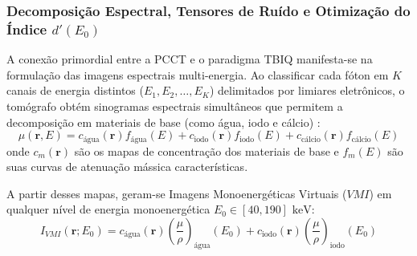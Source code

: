 \documentclass[
  12pt,
  a4paper,
  oneside
]{report}
\begin{document}
\subsubsection{Decomposição Espectral, Tensores de Ruído e Otimização do Índice $d'(E_0)$}
A conexão primordial entre a PCCT e o paradigma TBIQ manifesta-se na formulação das imagens espectrais multi-energia. Ao classificar cada fóton em $K$ canais de energia distintos ($E_1, E_2, \dots, E_K$) delimitados por limiares eletrônicos, o tomógrafo obtém sinogramas espectrais simultâneos que permitem a decomposição em materiais de base (como água, iodo e cálcio) \cite{rajendran2021, pimenta2026}:
\begin{equation}
  \mu(\mathbf{r}, E) = c_{\text{água}}(\mathbf{r}) f_{\text{água}}(E) + c_{\text{iodo}}(\mathbf{r}) f_{\text{iodo}}(E) + c_{\text{cálcio}}(\mathbf{r}) f_{\text{cálcio}}(E)
  \label{eq:decomposicao_materiais_base}
\end{equation}
onde $c_m(\mathbf{r})$ são os mapas de concentração dos materiais de base e $f_m(E)$ são suas curvas de atenuação mássica características.

A partir desses mapas, geram-se Imagens Monoenergéticas Virtuais ($VMI$) em qualquer nível de energia monoenergética $E_0 \in [40, 190]\text{ keV}$:
\begin{equation}
  I_{VMI}(\mathbf{r}; E_0) = c_{\text{água}}(\mathbf{r}) \left(\frac{\mu}{\rho}\right)_{\text{água}}(E_0) + c_{\text{iodo}}(\mathbf{r}) \left(\frac{\mu}{\rho}\right)_{\text{iodo}}(E_0)
  \label{eq:vmi_formula}
\end{equation}
\end{document}
